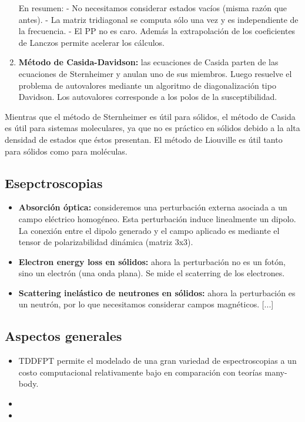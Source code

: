 \begin{enumerate}
      En resumen:
        - No necesitamos considerar estados vacíos (misma razón que antes).
        - La matriz tridiagonal se computa sólo una vez y es independiente de la frecuencia.
        - El PP no es caro. Además la extrapolación de los coeficientes de Lanczos permite acelerar los cálculos.
      \item \textbf{Método de Casida-Davidson:} las ecuaciones de Casida parten de las ecuaciones de Sternheimer y anulan uno de sus miembros. Luego resuelve el problema de autovalores mediante un algoritmo de diagonalización tipo Davidson. Los autovalores corresponde a los polos de la susceptibilidad.
    \end{enumerate}

    Mientras que el método de Sternheimer es útil para sólidos, el método de Casida es útil para sistemas moleculares, ya que no es práctico en sólidos debido a la alta densidad de estados que éstos presentan. El método de Liouville es útil tanto para sólidos como para moléculas.

\subsection{Esepctroscopias}

  \begin{itemize}
    \item \textbf{Absorción óptica:} consideremos una perturbación externa asociada a un campo eléctrico homogéneo. Esta perturbación induce linealmente un dipolo. La conexión entre el dipolo generado y el campo aplicado es mediante el tensor de polarizabilidad dinámica (matriz 3x3).
    \item \textbf{Electron energy loss en sólidos:} ahora la perturbación no es un fotón, sino un electrón (una onda plana). Se mide el scaterring de los electrones.
    \item \textbf{Scattering inelástico de neutrones en sólidos:} ahora la perturbación es un neutrón, por lo que necesitamos considerar campos magnéticos. [...]
  \end{itemize}

\subsection{Aspectos generales}

  \begin{itemize}
    \item TDDFPT permite el modelado de una gran variedad de espectroscopias a un costo computacional relativamente bajo en comparación con teorías many-body.
    \item
    \item
  \end{itemize}

